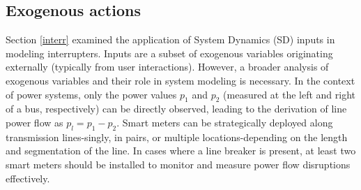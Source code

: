 \documentclass[11pt, a4paper]{article}
\theoremstyle{definition}
\theoremstyle{plain}
\theoremstyle{plain}
\theoremstyle{remark}
\theoremstyle{remark}
\theoremstyle{remark}
\begin{document}
{	
%

}

\subsection{Exogenous actions}

Section \ref{interr} examined the application of System Dynamics (SD) inputs in modeling interrupters. Inputs are a subset of exogenous variables originating externally (typically from user interactions). However, a broader analysis of exogenous variables and their role in system modeling is necessary. In the context of power systems, only the power values $p_1$ and $p_2$ (measured at the left and right of a bus, respectively) can be directly observed, leading to the derivation of line power flow as $p_l=p_1-p_2$. 
Smart meters can be strategically deployed along transmission lines-singly, in pairs, or multiple locations-depending on the length and segmentation of the line. In cases where a line breaker is present, at least two smart meters should be installed to monitor and measure power flow disruptions effectively.
\end{document}
